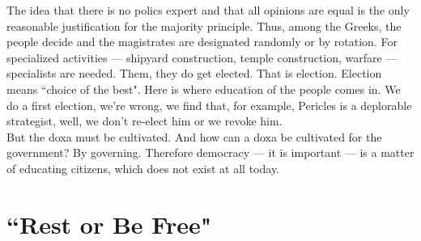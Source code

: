 The idea that there is no polics expert and that all opinions are equal is the only reasonable justification for the majority principle. Thus, among the Greeks, the people decide and the magistrates are designated randomly or by rotation. For specialized activities --- shipyard construction, temple construction, warfare --- specialists are needed. Them, they do get elected. That is election. Election means ``choice of the best". Here is where education of the people comes in. We do a first election, we're wrong, we find that, for example, Pericles is a deplorable strategist, well, we don't re-elect him or we revoke him.\\
But the doxa must be cultivated. And how can a doxa be cultivated for the government? By governing. Therefore democracy --- it is important --- is a matter of educating citizens, which does not exist at all today.

\section*{``Rest or Be Free"}

